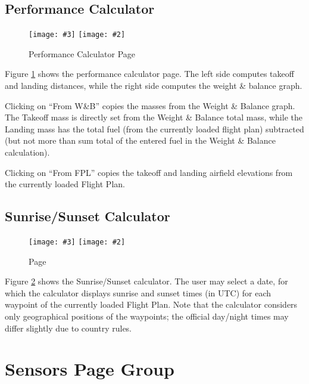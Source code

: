 \documentclass[a4paper,10pt,pdftex]{article}
\newcommand{\jnxfig}[3][]{\ifmypdf\texttt{[image: \#3]}
  \else\texttt{[image: \#2]}\fi}
\begin{document}
\subsection{Performance Calculator}

\begin{figure}[!htbp]
  \begin{center}
    \jnxfig[scale=0.5]{perfpage.eps}{perfpage.png}
    \caption{Performance Calculator Page}
    \label{fig:perfpage}
  \end{center}
\end{figure}

Figure \ref{fig:perfpage} shows the performance calculator page. The
left side computes takeoff and landing distances, while the right side
computes the weight \& balance graph.

Clicking on ``From W\&B'' copies the masses from the Weight \& Balance
graph. The Takeoff mass is directly set from the Weight \& Balance
total mass, while the Landing mass has the total fuel (from the
currently loaded flight plan) subtracted (but not more than sum total
of the entered fuel in the Weight \& Balance calculation).

Clicking on ``From FPL'' copies the takeoff and landing airfield
elevations from the currently loaded Flight Plan.

\subsection{Sunrise/Sunset Calculator}

\begin{figure}[!htbp]
  \begin{center}
    \jnxfig[scale=0.5]{srsspage.eps}{srsspage.png}
    \caption{ Page}
    \label{fig:srsspage}
  \end{center}
\end{figure}

Figure \ref{fig:srsspage} shows the Sunrise/Sunset calculator. The
user may select a date, for which the calculator displays sunrise and
sunset times (in UTC) for each waypoint of the currently loaded Flight
Plan. Note that the calculator considers only geographical positions
of the waypoints; the official day/night times may differ slightly due
to country rules.

\section{Sensors Page Group}
\end{document}
